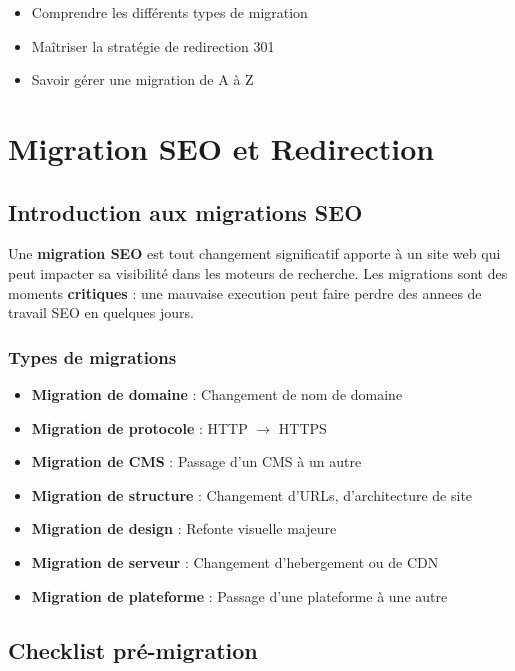 \documentclass[12pt,a4paper,twoside]{report}
\newcommand{\keyword}[1]{\textbf{\textcolor{googleblue}{#1}}}
\newcommand{\important}[1]{\textbf{\textcolor{googlered}{#1}}}
\newcommand{\level}[1]{\medskip\bigskip}
\begin{document}
\level{3}
\begin{objectives}
\begin{itemize}
    \item Comprendre les différents types de migration
    \item Maîtriser la stratégie de redirection 301
    \item Savoir gérer une migration de A à Z
\end{itemize}
\end{objectives}

\chapter{Migration SEO et Redirection}
\label{ch:migration}

\section{Introduction aux migrations SEO}

Une \keyword{migration SEO} est tout changement significatif apporte à un site web qui peut impacter sa visibilité dans les moteurs de recherche. Les migrations sont des moments \important{critiques} : une mauvaise execution peut faire perdre des annees de travail SEO en quelques jours.

\subsection{Types de migrations}

\begin{itemize}
    \item \textbf{Migration de domaine} : Changement de nom de domaine
    \item \textbf{Migration de protocole} : HTTP $\rightarrow$ HTTPS
    \item \textbf{Migration de CMS} : Passage d'un CMS à un autre
    \item \textbf{Migration de structure} : Changement d'URLs, d'architecture de site
    \item \textbf{Migration de design} : Refonte visuelle majeure
    \item \textbf{Migration de serveur} : Changement d'hebergement ou de CDN
    \item \textbf{Migration de plateforme} : Passage d'une plateforme à une autre
\end{itemize}

\section{Checklist pré-migration}
\end{document}
